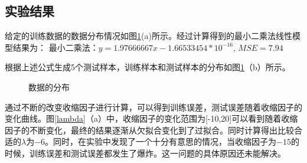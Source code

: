 \documentclass[final]{cvpr}
\begin{document}
\subsection{实验结果}
给定的训练数据的数据分布情况如图\ref{data}(a)所示。经过计算得到的最小二乘法线性模型结果为：
最小二乘法：$y = 1.97666667x-1.66533454*10^{-16}$, $MSE = 7.94$\par
根据上述公式生成5个测试样本，训练样本和测试样本的分布如图\ref{data}（b）所示。
\begin{figure}[htbp]
    \centering
\caption{数据的分布}
\label{data}               
\end{figure}
通过不断的改变收缩因子进行计算，可以得到训练误差，测试误差随着收缩因子的变化曲线。图\ref{lambda}（a）中，收缩因子的变化范围为[-10,20]可以看到随着收缩因子的不断变化，最终的结果逐渐从欠拟合变化到了过拟合。同时计算得出比较合适的$\lambda$为$-6$。同时，在实验中发现了一个十分有意思的情况，当收缩因子为$-15$的时候，训练误差和测试误差都发生了爆炸。这一问题的具体原因还未能解决。\par
\end{document}
